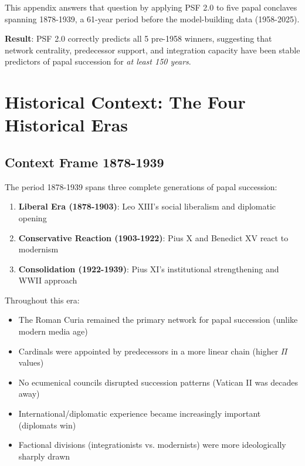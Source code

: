 This appendix answers that question by applying PSF 2.0 to five papal conclaves spanning 1878-1939, a 61-year period before the model-building data (1958-2025).

\textbf{Result}: PSF 2.0 correctly predicts all 5 pre-1958 winners, suggesting that network centrality, predecessor support, and integration capacity have been stable predictors of papal succession for \textit{at least 150 years}.


\section{Historical Context: The Four Historical Eras}

\subsection{Context Frame 1878-1939}

The period 1878-1939 spans three complete generations of papal succession:

\begin{enumerate}
    \item \textbf{Liberal Era (1878-1903)}: Leo XIII's social liberalism and diplomatic opening
    \item \textbf{Conservative Reaction (1903-1922)}: Pius X and Benedict XV react to modernism
    \item \textbf{Consolidation (1922-1939)}: Pius XI's institutional strengthening and WWII approach
\end{enumerate}

Throughout this era:
\begin{itemize}
    \item The Roman Curia remained the primary network for papal succession (unlike modern media age)
    \item Cardinals were appointed by predecessors in a more linear chain (higher $\Pi$ values)
    \item No ecumenical councils disrupted succession patterns (Vatican II was decades away)
    \item International/diplomatic experience became increasingly important (diplomats win)
    \item Factional divisions (integrationists vs. modernists) were more ideologically sharply drawn
\end{itemize}

